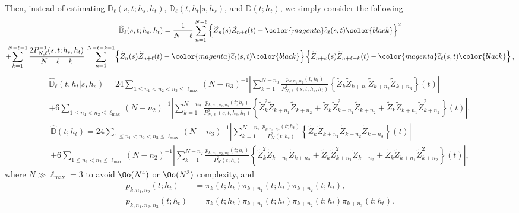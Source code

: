 Then, instead of estimating $\mathbb{D}_\ell(s, t; h_s, h_t)$, $\mathbb{D}_\ell(t,h_t|s,h_s)$, and $\mathbb{D}(t; h_t)$, we simply consider the following
\begin{multline}
	\widehat{\mathbb{D}}_\ell(s,t;h_s, h_t)
	= \frac{1}{N-\ell} \sum_{n=1}^{N - \ell} \left\{\widetilde{Z}_n(s) \widetilde{Z}_{n + \ell}(t) - \color{magenta}\widetilde{c}_\ell (s,t)\color{black}\right\}^2 \\
	+ \!\!\!\!\sum_{k = 1}^{N-\ell - 1}\frac{2 P_{N,\ell}^{-1}(s, t; h_s, h_t)}{N - \ell - k} \Biggl|\sum_{n = 1}^{N - \ell - k - 1}\!\left\{\widetilde{Z}_n(s) \widetilde{Z}_{n + \ell}(t) - \color{magenta}\widetilde{c}_\ell (s,t)\color{black}\right\} \left\{\widetilde{Z}_{n + k}(s) \widetilde{Z}_{n + \ell + k}(t) - \color{magenta}\widetilde{c}_\ell (s,t)\color{black}\right\}\!\Biggr|,
\end{multline}
\begin{multline}
	\widehat{\mathbb{D}}_\ell(t,h_t|s,h_s)  = 24 \!\!\!\!\!\!\!\!\!\!\!\!\!\!\!\!\!\sum_{1\leq n_1<n_2<n_3\leq \ell_{\max}}\!\!\!\!\!\!\!\!\!\!\!\!\!\!\!\!(N - n_3)^{-1}\left|\sum_{k=1}^{N - n_3} \!\! \frac{p_{k,n_1, n_2}(t;h_t)}{P_{N,\ell}^{3}(s, t; h_s, h_t)} \left\{\widetilde{Z}_k \widetilde{Z}_{k + n_1} \widetilde{Z}_{k + n_2} \widetilde{Z}_{k + n_3}\right\}(t) \right| \\
	+ 6 \!\!\!\!\!\!\!\!\!\!\!\!\!\!\sum_{1\leq n_1<n_2\leq \ell_{\max}} \!\!\!\!\!\!\!\!\!\!\!\!\!(N - n_2)^{-1}\left|\sum_{k=1}^{N - n_2} \! \frac{p_{k,n_1, n_2, n_3}(t;h_t)}{P_{N,\ell}^{3}(s, t; h_s, h_t)} \left\{\widetilde{Z}_k^2 \widetilde{Z}_{k + n_1} \widetilde{Z}_{k + n_2} + \widetilde{Z}_k \widetilde{Z}_{k + n_1}^2 \widetilde{Z}_{k + n_2} + \widetilde{Z}_k \widetilde{Z}_{k + n_1} \widetilde{Z}_{k + n_2}^2\right\}(t)\right|,
\end{multline}
\begin{multline}
	\widehat{\mathbb{D}}(t; h_t)  = 24 \!\!\!\!\!\!\!\!\!\!\!\!\!\!\!\!\!\sum_{1\leq n_1<n_2<n_3\leq \ell_{\max}}\!\!\!\!\!\!\!\!\!\!\!\!\!\!\!\!(N - n_3)^{-1}\left|\sum_{k=1}^{N - n_3} \!\! \frac{p_{k,n_1, n_2}(t;h_t)}{P_N^{3}(t; h_t)}\left\{\widetilde{Z}_k \widetilde{Z}_{k + n_1} \widetilde{Z}_{k + n_2} \widetilde{Z}_{k + n_3}\right\}(t) \right| \\
	+ 6 \!\!\!\!\!\!\!\!\!\!\!\!\!\!\sum_{1\leq n_1<n_2\leq \ell_{\max}} \!\!\!\!\!\!\!\!\!\!\!\!\!(N - n_2)^{-1}\left|\sum_{k=1}^{N - n_2} \!\frac{p_{k,n_1, n_2, n_3}(t;h_t)}{P_N^{3}(t; h_t)} \left\{\widetilde{Z}_k^2 \widetilde{Z}_{k + n_1} \widetilde{Z}_{k + n_2} + \widetilde{Z}_k \widetilde{Z}_{k + n_1}^2 \widetilde{Z}_{k + n_2} + \widetilde{Z}_k \widetilde{Z}_{k + n_1} \widetilde{Z}_{k + n_2}^2\right\}(t)\right|,
\end{multline}
where $N \gg \ell_{\max} = 3$ to avoid $\Oo(N^4)$ or $\Oo(N^3)$ complexity, and
\begin{align}
	p_{k,n_1, n_2}(t;h_t) &= \pi_k(t;h_t)\pi_{k+n_1}(t;h_t)\pi_{k+n_2}(t;h_t), \\
	p_{k,n_1, n_2, n_3}(t;h_t) &= \pi_k(t;h_t)\pi_{k+n_1}(t;h_t)\pi_{k+n_2}(t;h_t)\pi_{k+n_3}(t;h_t).
\end{align}


